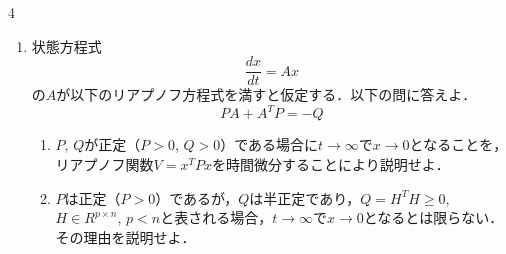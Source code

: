 \begin{multicols}{4}
\begin{enumerate}
{\begin{align*}
\begin{array}{c}
	    \frac{1}{m_0} \\
	    0 \\
	    0 
       \end{array}\right)
        F
\\[-0.5cm]
 y &=  \left(\begin{array}{cccccc}
		1 & 0 & 0 & 0 & 0 & 0 
       \end{array}\right)
 \left(\begin{array}{c}
	         y_0 \\
		     y_1 \\
		     y_2 \\
		     \frac{dy_0}{dt} \\
		     \frac{dy_1}{dt} \\
		     \frac{dy_2}{dt}
       \end{array}\right)
\end{align*}
}\\[-0.5cm]
となる．以下の問いに答えよ．
\begin{enumerate}
\item 
$(m_0, m_1, m_2, k_1, k_2)=(1,1,2,2,1)$の場合，可観測であるか否かを判断せよ．
\vspace{9cm}

\item
$(m_0, m_1, m_2, k_1, k_2)=(1,1,2,1,2)$の場合，可観測であるか否かを判断せよ．
\vspace*{9cm}

\end{enumerate}





\item
状態方程式
\[
	\frac{dx}{dt}= Ax
\]
の$A$が以下のリアプノフ方程式を満すと仮定する．以下の問に答えよ．
\[
	PA + A^T P = -Q
\]
\begin{enumerate}
\item 
$P$, $Q$が正定（$P>0$, $Q>0$）である場合に$t \rightarrow \infty$で$x \rightarrow 0$となることを，リアプノフ関数$V=x^T P x$を時間微分することにより説明せよ．
\vspace{9cm}

\item
$P$は正定（$P>0$）であるが，$Q$は半正定であり，$Q=H^T H \geq 0$, $H \in R^{p \times n}$, $p < n$と表される場合，$t \rightarrow \infty$で$x \rightarrow 0$となるとは限らない．その理由を説明せよ．
\vspace{6cm}


\end{enumerate}
\end{enumerate}
\end{multicols}
